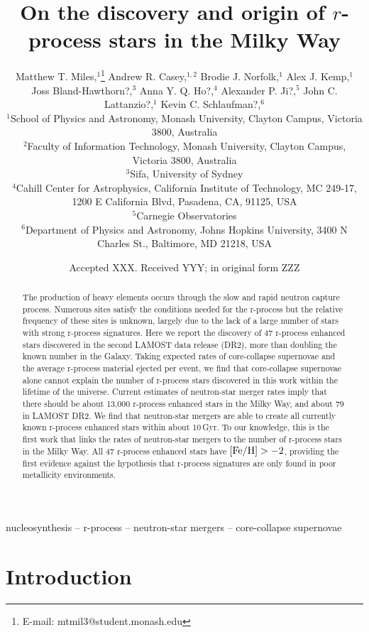 \documentclass[a4paper,fleqn,usenatbib]{mnras}
\title[Discovery and origin of $r$-process stars]{On the discovery and origin of $r$-process stars in the Milky Way}
\author[Matthew T. Miles et al.]{Matthew T. Miles,$^{1}$\thanks{E-mail: mtmil3@student.monash.edu}
	Andrew R. Casey,$^{1,2}$
	Brodie J. Norfolk,$^{1}$
	Alex J. Kemp,$^{1}$\newauthor
    Joss Bland-Hawthorn?,$^3$
    Anna Y. Q. Ho?,$^4$
    Alexander P. Ji?,$^5$
	John C. Lattanzio?,$^{1}$\newauthor
	Kevin C. Schlaufman?,$^{6}$
	\\
	$^{1}$School of Physics and Astronomy, Monash University, Clayton Campus, Victoria 3800, Australia\\
	$^{2}$Faculty of Information Technology, Monash University, Clayton Campus, Victoria 3800, Australia\\
    $^{3}$Sifa, University of Sydney\\
	$^{4}$Cahill Center for Astrophysics, California Institute of Technology, MC 249-17, 1200 E California Blvd, Pasadena, CA, 91125, USA\\
    $^{5}$Carnegie Observatories\\
    $^{6}$Department of Physics and Astronomy, Johns Hopkins University, 3400 N Charles St., Baltimore, MD 21218, USA
}
\date{Accepted XXX. Received YYY; in original form ZZZ}
\begin{document}
	\label{firstpage}
	\pagerange{\pageref{firstpage}--\pageref{lastpage}}
	\maketitle
	
	\begin{abstract}
		The production of heavy elements occurs through the slow and rapid neutron capture process. Numerous sites satisfy the conditions needed for the r-process but the relative frequency of these sites is unknown, largely due to the lack of a large number of stars with strong r-process signatures. Here we report the discovery of 47 r-process enhanced stars discovered in the second LAMOST data release (DR2), more than doubling the known number in the Galaxy. Taking expected rates of core-collapse supernovae and the average r-process material ejected per event, we find that core-collapse supernovae alone cannot explain the number of r-process stars discovered in this work within the lifetime of the universe. Current estimates of neutron-star merger rates imply that there should be about 13,000 r-process enhanced stars in the Milky Way, and about $79$ in LAMOST DR2. We find that neutron-star mergers are able to create all currently known r-process enhanced stars within about 10\,Gyr. To our knowledge, this is the first work that links the rates of neutron-star mergers to the number of r-process stars in the Milky Way. All 47 r-process enhanced stars have $[{\rm Fe/H}] > -2$, providing the first evidence against the hypothesis that r-process signatures are only found in poor metallicity environments.
	\end{abstract}
	
	\begin{keywords}
		nucleosynthesis -- r-process -- neutron-star mergers -- core-collapse supernovae
	\end{keywords}
	
	
	\section{Introduction}
	
\end{document}
